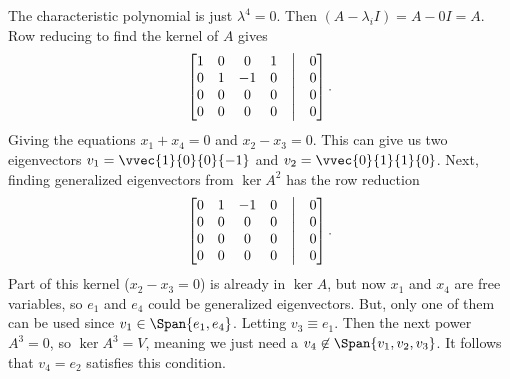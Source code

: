 The characteristic polynomial is just $\lambda^4 = 0$. Then $(A-\lambda_i I) = A - 0I = A$. Row reducing to find the kernel of $A$ gives
$$\begin{bmatrix}
    1&0&0&1& \bigm| & 0\\
    0&1&-1&0  &\bigm| & 0\\
    0&0&0&0&\bigm| & 0\\
    0&0&0&0&\bigm| & 0
\end{bmatrix}.$$
Giving the equations $x_1 + x_4 = 0$ and $x_2 - x_3 = 0$. This can give us two eigenvectors $v_1 = \vvec{1}{0}{0}{-1}$ and $v_2 = \vvec{0}{1}{1}{0}$. Next, finding generalized eigenvectors from $\ker{A^2}$ has the row reduction 
$$\begin{bmatrix}
    0&1&-1&0& \bigm| & 0\\
    0&0&0&0&\bigm| & 0 \\
    0&0&0&0&\bigm| & 0\\
    0&0&0&0&\bigm| & 0
\end{bmatrix}.$$
Part of this kernel ($x_2 - x_3 = 0$) is already in $\ker A$, but now $x_1$ and $x_4$ are free variables, so $e_1$ and $e_4$ could be generalized eigenvectors. But, only one of them can be used since $v_1 \in \Span{e_1, e_4}$. Letting $v_3 \equiv e_1$. Then the next power $A^3 = 0$, so $\ker A^3 = V$, meaning we just need a $v_4 \not \in \Span{v_1, v_2, v_3}$. It follows that $v_4 = e_2$ satisfies this condition.
